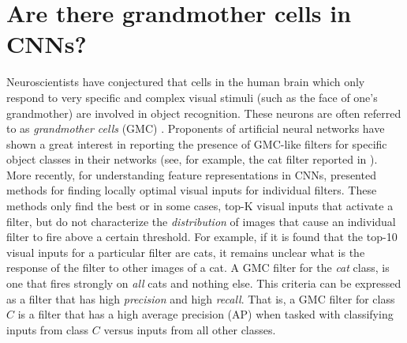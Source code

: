 \section{Are there grandmother cells in CNNs?}
\label{sec:grand-mother}
Neuroscientists have conjectured that cells in the human brain which only respond to very specific and complex visual stimuli (such as the face of one's grandmother) are involved in object recognition.
These neurons are often referred to as \emph{grandmother cells} (GMC) \cite{Barlow,Grandmother}. Proponents of artificial neural networks have shown a great interest in reporting the presence of GMC-like filters for specific object classes in their networks (see, for example, the cat filter reported in \cite{GoogleCat}). More recently, for understanding feature representations in CNNs, \cite{Simonyan,DeConv} presented methods for finding locally optimal visual inputs for individual filters.
These methods only find the best or in some cases, top-K visual inputs that activate a filter, but do not characterize the \emph{distribution} of images that cause an individual filter to fire above a certain threshold. For example, if it is found that the top-10 visual inputs for a particular filter are cats, it remains unclear what is the response of the filter to other images of a cat.
A GMC filter for the \emph{cat} class, is one that fires strongly on \emph{all} cats and nothing else.
This criteria can be expressed as a filter that has high \emph{precision} and high \emph{recall}.
That is, a GMC filter for class $C$ is a filter that has a high average precision (AP) when tasked with classifying inputs from class $C$ versus inputs from all other classes.

 
